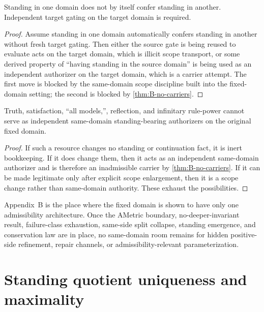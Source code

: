 \begin{corollary}
Standing in one domain does not by itself confer standing in another. Independent target gating on the target domain is required.
\end{corollary}

\begin{proof}
Assume standing in one domain automatically confers standing in another without fresh target gating. Then either the source gate is being reused to evaluate acts on the target domain, which is illicit scope transport, or some derived property of ``having standing in the source domain'' is being used as an independent authorizer on the target domain, which is a carrier attempt. The first move is blocked by the same-domain scope discipline built into the fixed-domain setting; the second is blocked by \cref{thm:B-no-carriers}.
\end{proof}

\begin{proposition}
\label{prop:B-no-semantic-import}
Truth, satisfaction, ``all models,'', reflection, and infinitary rule-power cannot serve as independent same-domain standing-bearing authorizers on the original fixed domain.
\end{proposition}

\begin{proof}
If such a resource changes no standing or continuation fact, it is inert bookkeeping. If it does change them, then it acts as an independent same-domain authorizer and is therefore an inadmissible carrier by \cref{thm:B-no-carriers}. If it can be made legitimate only after explicit scope enlargement, then it is a scope change rather than same-domain authority. These exhaust the possibilities.
\end{proof}

\begin{remark}
Appendix~B is the place where the fixed domain is shown to have only one admissibility architecture. Once the AMetric boundary, no-deeper-invariant result, failure-class exhaustion, same-side split collapse, standing emergence, and conservation law are in place, no same-domain room remains for hidden positive-side refinement, repair channels, or admissibility-relevant parameterization.
\end{remark}

\section{Standing quotient uniqueness and maximality}
